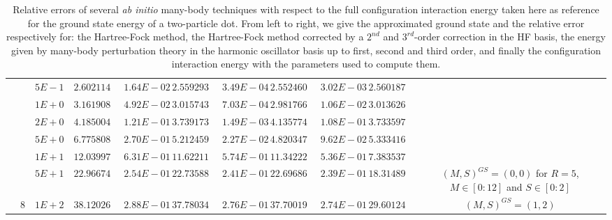 \begin{landscape}
\begin{table}[ht]
{\begin{tabular}[c]{c|c|c|c|c|c|c|c|c|c|c}
& &$5E-1$ & $2.602114062463$ & $1.64E-02$ & $2.559293672584$ & $3.49E-04$ & $2.552460563728$ & $3.02E-03$ & $2.560187735597$ &  \\
& &$1E+0$ & $3.161908943210$ & $4.92E-02$ & $3.015743447990$ & $7.03E-04$ & $2.981766772533$ & $1.06E-02$ & $3.013626129397$ &  \\
& &$2E+0$ & $4.185004164083$ & $1.21E-01$ & $3.739173812344$ & $1.49E-03$ & $4.135774696713$ & $1.08E-01$ & $3.733597603174$ &  \\
& &$5E+0$ & $6.775808076626$ & $2.70E-01$ & $5.212459550317$ & $2.27E-02$ & $4.820347271993$ & $9.62E-02$ & $5.333416434792$ &  \\
& &$1E+1$ & $12.039973698080$ & $6.31E-01$ & $11.622115727277$ & $5.74E-01$ & $11.342226056905$ & $5.36E-01$ & $7.383537264058$ &  \\
& &$5E+1$ & $22.966747273068$ & $2.54E-01$ & $22.735888141372$ & $2.41E-01$ & $22.696860293494$ & $2.39E-01$ & $18.314898304163$ & \multirow{-22}{3cm}{$(M,S)^{GS}=(0,0)$ for $R=5$, $M\in[0:12]$ and $S\in[0:2]$}  \\ \cline{10-11}
& \multirow{-23}{*}{8}  &$1E+2$ & $38.120267705447$ & $2.88E-01$ & $37.780344127957$ & $2.76E-01$ & $37.700193736724$ & $2.74E-01$ & $29.601244919262$ & \multirow{-1}{3cm}{$(M,S)^{GS}=(1,2)$} \\
\toprule[1pt]
\end{tabular}
}
 \caption{Relative errors of several \textit{ab initio} many-body techniques with respect to the full configuration interaction energy taken here as reference for the ground state energy of a two-particle dot. From left to right, we give the approximated ground state and the relative error respectively for: the Hartree-Fock method, the Hartree-Fock method corrected by a $2^{nd}$ and $3^{rd}$-order correction in the HF basis, the energy given by many-body perturbation theory in the harmonic oscillator basis up to first, second and third order, and finally the configuration interaction energy with the parameters used to compute them.}
\label{tab:comparisonMethods02eHF} 
\end{table} 
\end{landscape}


